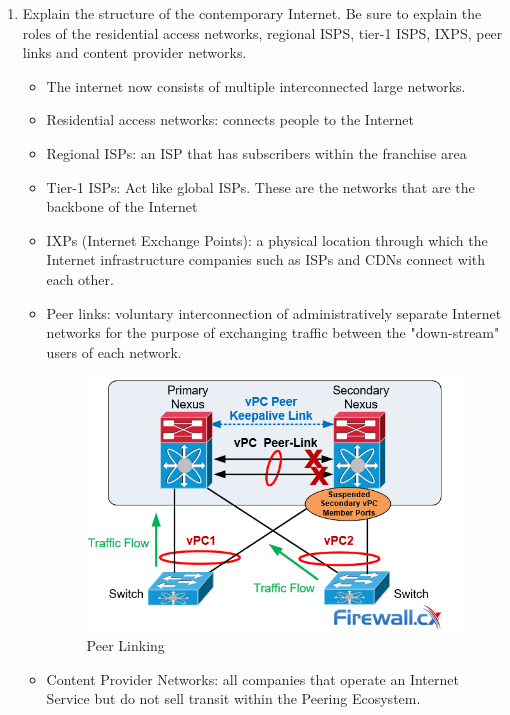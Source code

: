 \documentclass{article}
\begin{document}
\begin{enumerate}
\item Explain the structure of the contemporary Internet. Be sure to explain the roles of the residential access networks, regional ISPS, tier-1 ISPS, IXPS, peer links and content provider networks.
\begin{itemize}
\item The internet now consists of multiple interconnected large networks.
\item Residential access networks: connects people to the Internet
\item Regional ISPs: an ISP that has subscribers within the franchise area
\item Tier-1 ISPs: Act like global ISPs. These are the networks that are the backbone of the Internet
\item IXPs (Internet Exchange Points): a physical location through which the Internet infrastructure companies such as ISPs and CDNs connect with each other. 
\newpage
\item Peer links: voluntary interconnection of administratively separate Internet networks for the purpose of exchanging traffic between the "down-stream" users of each network.

\begin{figure}[!h]
\centering
\includegraphics[width=10cm]{peer-link.png}
\caption{Peer Linking}
\end{figure}

\item Content Provider Networks: all companies that operate an Internet Service but do not sell transit within the Peering Ecosystem.

\end{itemize}

\end{enumerate}
\end{document}
